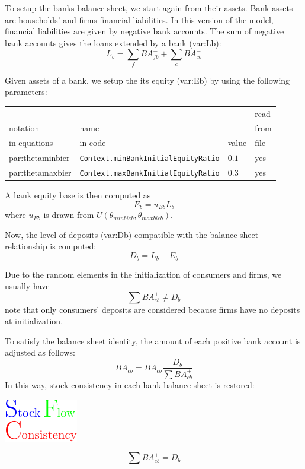 \documentclass{book}
\begin{document}
To setup the banks balance sheet, we start again from their assets. Bank assets are households' and firms financial liabilities. In this version of the model, financial liabilities are given by negative bank accounts. 
The sum of negative bank accounts gives the loans extended by a bank (\gls{var:Lb}):
\[
	L_b=\sum_f BA_{fb}^- + \sum_c BA_{cb}^-
\]



Given assets of a bank, we setup the its equity (\gls{var:Eb}) by using the following\\
parameters:\\
\begin{tabular}{l l l l}
	\hline
	& &&read\\
	notation& name &&from\\
	in equations& in code&value&file\\
	\hline
	\hline
 \gls{par:thetaminbier}&\verb+Context.minBankInitialEquityRatio+&$0.1$&yes\\
 \gls{par:thetamaxbier}&\verb+Context.maxBankInitialEquityRatio+&$0.3$&yes\\
	\hline
\end{tabular}

\vskip5mm
A bank equity base is then computed as
\[
	E_b=u_{Eb}L_b
\]
where $u_{Eb}$ is drawn from $U(\theta_{minbieb},\theta_{maxbieb})$.

Now, the level of deposits (\gls{var:Db}) compatible with the balance sheet relationship is computed:
\[
D_b=L_b-E_b
\]

Due to the random elements in the initialization of consumers and firms, we usually have
\[
	\sum BA^+_{cb} \neq D_b
\]
note that only consumers' deposits are considered because firms have no deposits at initialization.

To satisfy the balance sheet identity, the amount of each positive bank account is adjusted as follows:
\[
	BA^{+}_{cb}=BA^+_{cb}\frac{D_b}{\sum BA^+_{cb}}
\]
In this way, stock consistency in each bank balance sheet is restored:\begin{marginfigure}
	\hskip1cm\includegraphics[scale=1.0]{sfc_logo-0.pdf}
\end{marginfigure}

\[
	\sum BA^{+}_{cb}=D_b
\]

\newpage
\end{document}
